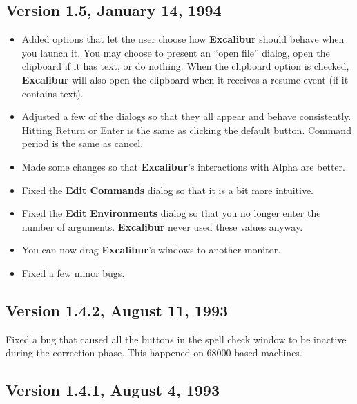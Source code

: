 \documentclass[11pt,titlepage]{article}
\newcommand{\ex}{\textbf{Excalibur}}
\begin{document}
\subsection{Version 1.5, January 14, 1994}

\begin{itemize}

\item Added options that let the user choose how \ex{} should behave
  when you launch it.  You may choose to present an ``open file''
  dialog, open the clipboard if it has text, or do nothing.  When the
  clipboard option is checked, \ex{} will also open the clipboard when
  it receives a resume event (if it contains text).

\item Adjusted a few of the dialogs so that they all appear and behave
  consistently.  Hitting Return or Enter is the same as clicking the
  default button.  Command period is the same as cancel.

\item Made some changes so that \ex's interactions with Alpha are
  better.

\item Fixed the \textbf{Edit Commands} dialog so that it is a bit more
  intuitive.

\item Fixed the \textbf{Edit Environments} dialog so that you no
  longer enter the number of arguments.  \ex{} never used these values
  anyway.

\item You can now drag \ex's windows to another monitor.

\item Fixed a few minor bugs.

\end{itemize}

\subsection{Version 1.4.2, August 11, 1993}

Fixed a bug that caused all the buttons in the spell check window to
be inactive during the correction phase.  This happened on 68000 based
machines.

\subsection{Version 1.4.1, August 4, 1993}
\end{document}
